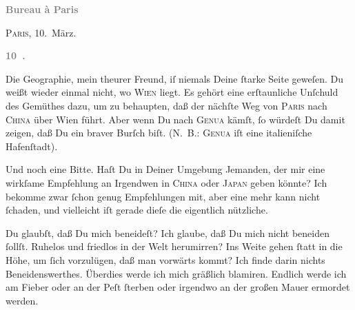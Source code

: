 \pstart
           \begin{otherlanguage}{french}\textcolor{gray}{\textbf{\textbf{Bureau à Paris}}}\end{otherlanguage}\hfill \textsc{Paris}, 10. März.\pend
           
\pstart
           \begin{otherlanguage}{french}\textcolor{gray}{\textbf{\textbf{10 .}}}\end{otherlanguage}\pend
           \vspace{0.5em}
\pstart
           Die Geographie, mein theurer Freund, iſ niemals Deine
               ſtarke Seite geweſen. Du weißt wieder einmal nicht, wo \textsc{Wien} liegt. Es gehört eine erſtaunliche Unſchuld des Gemüthes dazu, um zu behaupten,
               daß der nächſte Weg von \textsc{Paris} nach \textsc{China} über Wien führt. Aber wenn Du nach \textsc{Genua} kämſt, ſo würdeſt Du damit zeigen, daß Du ein braver Burſch biſt. \introOben{}(\textsc{N. B.: Genua} iſt eine italieniſche
                  Hafenſtadt).\introOben{}\pend
           
\pstart
            Und noch eine Bitte. Haſt Du in Deiner Umgebung Jemanden, {\pb}der mir eine wirkſame Empfehlung an Irgendwen in \textsc{China} oder \textsc{Japan} geben könnte? Ich bekomme zwar ſchon genug Empfehlungen mit, aber eine mehr
               kann nicht ſchaden, und vielleicht iſt gerade dieſe die eigentlich\strikeout{\textcolor{gray}{e}} nützliche.\pend
           
\pstart
           Du glaubſt, daß Du mich beneideſt? Ich glaube, daß Du mich nicht beneiden ſollſt.
               Ruhelos und friedlos in der Welt herumirren?  Ins Weite gehen ſtatt in die Höhe, um ſich
               vorzulügen, daß man {\pb}vorwärts kommt? Ich finde darin
               nichts Beneidenswerthes. Überdies werde ich mich gräßlich  blamiren. Endlich werde ich \strikeout{\textcolor{gray}{a}} am Fieber \introOben{}oder\introOben{} an der Peſt  ſterben oder irgendwo an der großen Mauer ermordet werden.\pend
           
